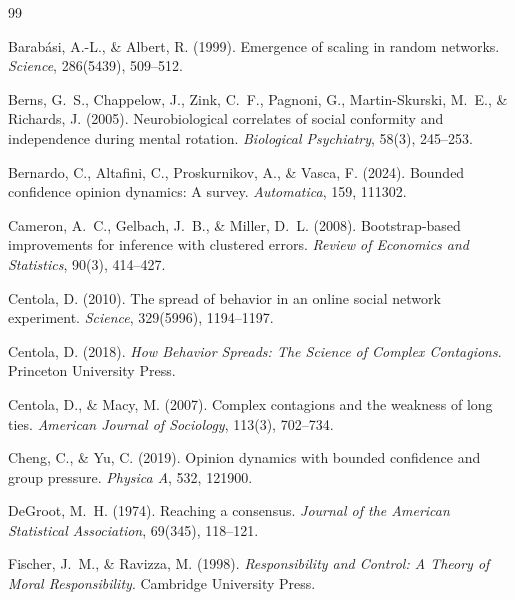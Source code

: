 \documentclass[11pt, a4paper]{article}
\begin{document}


\begin{thebibliography}{99}

Barab\'{a}si, A.-L., \& Albert, R. (1999).
Emergence of scaling in random networks.
\textit{Science}, 286(5439), 509--512.

Berns, G.~S., Chappelow, J., Zink, C.~F., Pagnoni, G., Martin-Skurski, M.~E., \& Richards, J. (2005).
Neurobiological correlates of social conformity and independence during mental rotation.
\textit{Biological Psychiatry}, 58(3), 245--253.

Bernardo, C., Altafini, C., Proskurnikov, A., \& Vasca, F. (2024).
Bounded confidence opinion dynamics: A survey.
\textit{Automatica}, 159, 111302.

Cameron, A.~C., Gelbach, J.~B., \& Miller, D.~L. (2008).
Bootstrap-based improvements for inference with clustered errors.
\textit{Review of Economics and Statistics}, 90(3), 414--427.

Centola, D. (2010).
The spread of behavior in an online social network experiment.
\textit{Science}, 329(5996), 1194--1197.

Centola, D. (2018).
\textit{How Behavior Spreads: The Science of Complex Contagions}.
Princeton University Press.

Centola, D., \& Macy, M. (2007).
Complex contagions and the weakness of long ties.
\textit{American Journal of Sociology}, 113(3), 702--734.

Cheng, C., \& Yu, C. (2019).
Opinion dynamics with bounded confidence and group pressure.
\textit{Physica A}, 532, 121900.

DeGroot, M.~H. (1974).
Reaching a consensus.
\textit{Journal of the American Statistical Association}, 69(345), 118--121.

Fischer, J.~M., \& Ravizza, M. (1998).
\textit{Responsibility and Control: A Theory of Moral Responsibility}.
Cambridge University Press.


\end{thebibliography}
\end{document}
